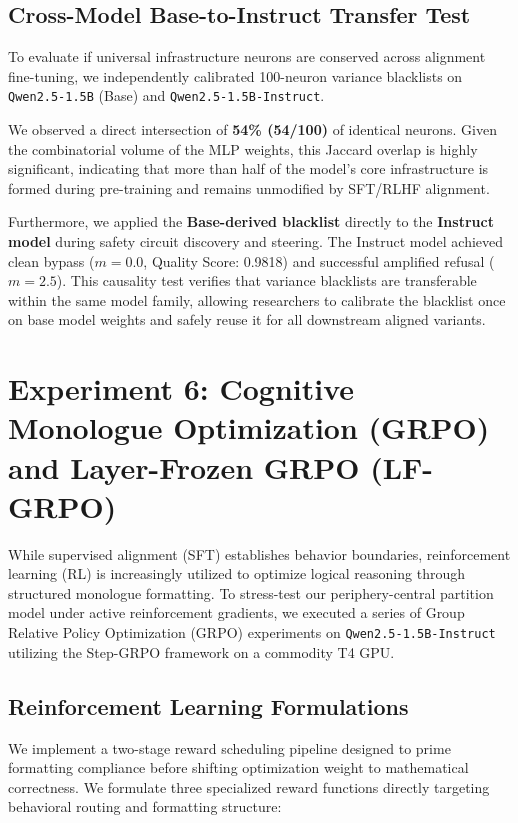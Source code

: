 \documentclass[11pt]{article}
\begin{document}
\subsection{Cross-Model Base-to-Instruct Transfer Test}
To evaluate if universal infrastructure neurons are conserved across alignment fine-tuning, we independently calibrated 100-neuron variance blacklists on \texttt{Qwen2.5-1.5B} (Base) and \texttt{Qwen2.5-1.5B-Instruct}.

We observed a direct intersection of \textbf{54\% (54/100)} of identical neurons. Given the combinatorial volume of the MLP weights, this Jaccard overlap is highly significant, indicating that more than half of the model's core infrastructure is formed during pre-training and remains unmodified by SFT/RLHF alignment.

Furthermore, we applied the \textbf{Base-derived blacklist} directly to the \textbf{Instruct model} during safety circuit discovery and steering. The Instruct model achieved clean bypass ($m=0.0$, Quality Score: 0.9818) and successful amplified refusal ($m=2.5$). This causality test verifies that variance blacklists are transferable within the same model family, allowing researchers to calibrate the blacklist once on base model weights and safely reuse it for all downstream aligned variants.

\section{Experiment 6: Cognitive Monologue Optimization (GRPO) and Layer-Frozen GRPO (LF-GRPO)}

While supervised alignment (SFT) establishes behavior boundaries, reinforcement learning (RL) is increasingly utilized to optimize logical reasoning through structured monologue formatting. To stress-test our periphery-central partition model under active reinforcement gradients, we executed a series of Group Relative Policy Optimization (GRPO) experiments on \texttt{Qwen2.5-1.5B-Instruct} utilizing the Step-GRPO framework on a commodity T4 GPU.

\subsection{Reinforcement Learning Formulations}

We implement a two-stage reward scheduling pipeline designed to prime formatting compliance before shifting optimization weight to mathematical correctness. We formulate three specialized reward functions directly targeting behavioral routing and formatting structure:
\end{document}
